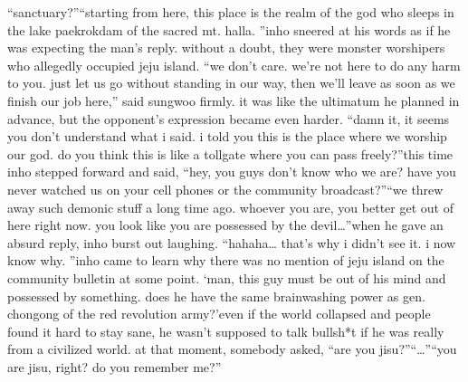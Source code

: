 “sanctuary?”“starting from here, this place is the realm of the god who sleeps in the lake paekrokdam of the sacred mt.
 halla.
”inho sneered at his words as if he was expecting the man’s reply.
 without a doubt, they were monster worshipers who allegedly occupied jeju island.
“we don’t care.
 we’re not here to do any harm to you.
 just let us go without standing in our way, then we’ll leave as soon as we finish our job here,” said sungwoo firmly.
it was like the ultimatum he planned in advance, but the opponent’s expression became even harder.
“damn it, it seems you don’t understand what i said.
 i told you this is the place where we worship our god.
 do you think this is like a tollgate where you can pass freely?”this time inho stepped forward and said, “hey, you guys don’t know who we are? have you never watched us on your cell phones or the community broadcast?”“we threw away such demonic stuff a long time ago.
 whoever you are, you better get out of here right now.
 you look like you are possessed by the devil…”when he gave an absurd reply, inho burst out laughing.
“hahaha… that’s why i didn’t see it.
 i now know why.
”inho came to learn why there was no mention of jeju island on the community bulletin at some point.
‘man, this guy must be out of his mind and possessed by something.
 does he have the same brainwashing power as gen.
 chongong of the red revolution army?’even if the world collapsed and people found it hard to stay sane, he wasn’t supposed to talk bullsh*t if he was really from a civilized world.
at that moment, somebody asked, “are you jisu?”“…”“you are jisu, right? do you remember me?”

 